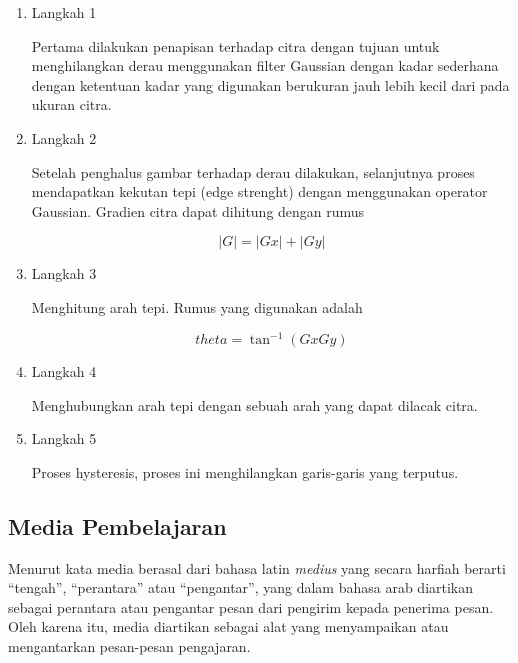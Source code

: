 \begin{enumerate}[leftmargin=1cm, itemindent=0.6cm,labelwidth=15pt, labelsep=5pt, listparindent=1cm,align=left]
    \begin{enumerate}
        \item Langkah 1

        Pertama dilakukan penapisan terhadap citra dengan tujuan untuk menghilangkan derau menggunakan filter Gaussian dengan kadar sederhana dengan ketentuan kadar yang digunakan berukuran jauh lebih kecil dari pada ukuran citra.

        \item Langkah 2

        Setelah penghalus gambar terhadap derau dilakukan, selanjutnya proses mendapatkan kekutan tepi (edge strenght) dengan menggunakan operator Gaussian. Gradien citra dapat dihitung dengan rumus

        \begin{equation}
        \left | G \right | = \left | Gx \right | + \left | Gy \right |
        \end{equation}

        \item Langkah 3

        Menghitung arah tepi. Rumus yang digunakan adalah

        \begin{equation}
        theta= \tan ^{-1}(GxGy)
        \end{equation}

        \item Langkah 4

        Menghubungkan arah tepi dengan sebuah arah yang dapat dilacak citra.

    \item Langkah 5

        Proses hysteresis, proses ini menghilangkan garis-garis yang terputus.
    \end{enumerate}

\end{enumerate}

\subsection{Media Pembelajaran}
Menurut \textcite{arsyad2015media} kata media berasal dari bahasa latin \textit{medius} yang secara harfiah berarti ``tengah'', ``perantara'' atau ``pengantar'', yang dalam bahasa arab diartikan sebagai perantara atau pengantar pesan dari pengirim kepada penerima pesan. Oleh karena itu, media diartikan sebagai alat yang menyampaikan atau mengantarkan pesan-pesan pengajaran.

